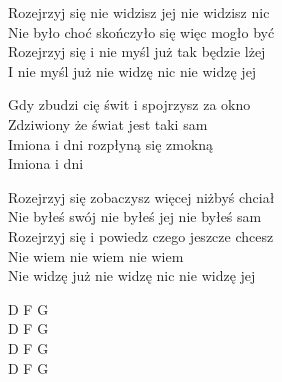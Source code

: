 \begin{text}
    Rozejrzyj się nie widzisz jej nie widzisz nic\\
    Nie było choć skończyło się więc mogło być\\
    Rozejrzyj się i nie myśl już tak będzie lżej\\
    I nie myśl już nie widzę nic nie widzę jej

    Gdy zbudzi cię świt i spojrzysz za okno\\
    Zdziwiony że świat jest taki sam\\
    Imiona i dni rozpłyną się zmokną\\
    Imiona i dni

    Rozejrzyj się zobaczysz więcej niżbyś chciał\\
    Nie byłeś swój nie byłeś jej nie byłeś sam\\
    Rozejrzyj się i powiedz czego jeszcze chcesz\\
    Nie wiem nie wiem nie wiem\\
    Nie widzę już nie widzę nic nie widzę jej
\end{text}
\begin{chord}
    D F G\\
    D F G\\
    D F G\\
    D F G
\end{chord}